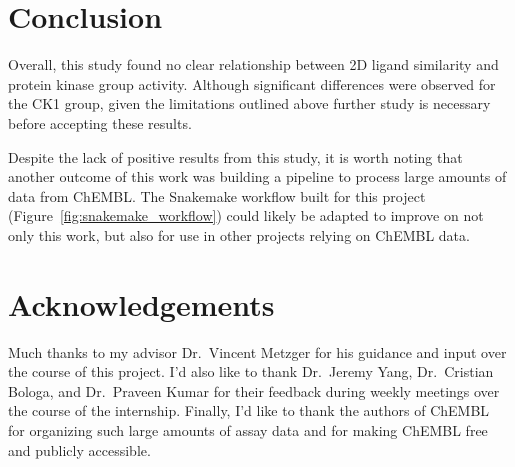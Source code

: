 \documentclass[11pt]{article}
\begin{document}
\section{Conclusion}
Overall, this study found no clear relationship between 2D ligand similarity and protein kinase group activity. Although significant differences were observed for the CK1 group, given the limitations outlined above further study is necessary before accepting these results. 

Despite the lack of positive results from this study, it is worth noting that another outcome of this work was building a pipeline to process large amounts of data from ChEMBL.
The Snakemake workflow built for this project (Figure~\ref{fig:snakemake_workflow}) could likely be adapted to improve on not only this work, but also for use in other projects relying on ChEMBL data. 
\section{Acknowledgements}
Much thanks to my advisor Dr.~Vincent Metzger for his guidance and input over the course of this project. I'd also like to thank Dr.~Jeremy Yang, Dr.~Cristian Bologa, and Dr.~Praveen Kumar for their feedback during weekly meetings over the course of the internship. Finally, I'd like to thank the   authors of ChEMBL~\cite{chembl_db_2023} for organizing such large amounts of assay data and for making ChEMBL free and publicly accessible.


\end{document}
